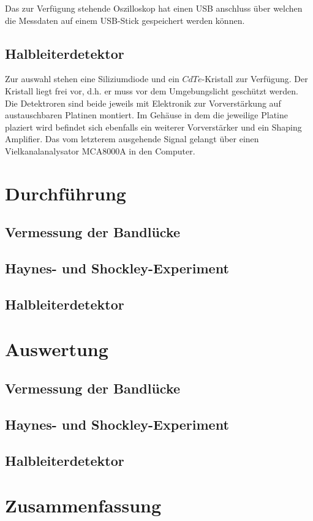 \documentclass[12pt]{article}
\begin{document}
Das zur Verfügung stehende Oszilloskop hat einen USB anschluss über welchen die Messdaten auf einem USB-Stick gespeichert werden können.

\subsection{Halbleiterdetektor}
Zur auswahl stehen eine Siliziumdiode und ein $CdTe$-Kristall zur Verfügung. Der Kristall liegt frei vor, d.h. er muss vor dem Umgebungslicht geschützt werden. Die Detektroren sind beide jeweils mit Elektronik zur Vorverstärkung auf austauschbaren Platinen montiert. Im Gehäuse in dem die jeweilige Platine plaziert wird befindet sich ebenfalls ein weiterer Vorverstärker und ein Shaping Amplifier. Das vom letzterem ausgehende Signal gelangt über einen Vielkanalanalysator MCA8000A in den Computer.

\section{Durchführung}
\subsection{Vermessung der Bandlücke}
\subsection{Haynes- und Shockley-Experiment}
\subsection{Halbleiterdetektor}

\section{Auswertung}
\subsection{Vermessung der Bandlücke}
\subsection{Haynes- und Shockley-Experiment}
\subsection{Halbleiterdetektor}

\section{Zusammenfassung}
\end{document}
